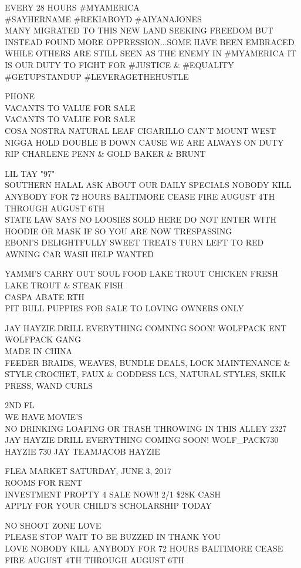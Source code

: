 \documentclass[10pt,letterpaper]{article}
\begin{document}
EVERY 28 HOURS \#MYAMERICA\\
\#SAYHERNAME \#REKIABOYD \#AIYANAJONES\\
MANY MIGRATED TO THIS NEW LAND SEEKING FREEDOM BUT INSTEAD FOUND MORE OPPRESSION...SOME HAVE BEEN EMBRACED WHILE OTHERS ARE STILL SEEN AS THE ENEMY IN \#MYAMERICA IT IS OUR DUTY TO FIGHT FOR \#JUSTICE \& \#EQUALITY \#GETUPSTANDUP \#LEVERAGETHEHUSTLE

PHONE\\
VACANTS TO VALUE FOR SALE\\
VACANTS TO VALUE FOR SALE\\
COSA NOSTRA NATURAL LEAF CIGARILLO CAN'T MOUNT WEST NIGGA HOLD DOUBLE B DOWN CAUSE WE ARE ALWAYS ON DUTY RIP CHARLENE PENN \& GOLD BAKER \& BRUNT

LIL TAY "97"\\
SOUTHERN HALAL ASK ABOUT OUR DAILY SPECIALS NOBODY KILL ANYBODY FOR 72 HOURS BALTIMORE CEASE FIRE AUGUST 4TH THROUGH AUGUST 6TH\\
STATE LAW SAYS NO LOOSIES SOLD HERE DO NOT ENTER WITH HOODIE OR MASK IF SO YOU ARE NOW TRESPASSING\\
EBONI'S DELIGHTFULLY SWEET TREATS TURN LEFT TO RED AWNING CAR WASH HELP WANTED

YAMMI'S CARRY OUT SOUL FOOD LAKE TROUT CHICKEN FRESH LAKE TROUT \& STEAK FISH\\
CASPA ABATE RTH\\
PIT BULL PUPPIES FOR SALE TO LOVING OWNERS ONLY

JAY HAYZIE DRILL EVERYTHING COMNING SOON!  WOLFPACK ENT WOLFPACK GANG\\
MADE IN CHINA\\
FEEDER BRAIDS, WEAVES, BUNDLE DEALS, LOCK MAINTENANCE \& STYLE CROCHET, FAUX \& GODDESS LCS, NATURAL STYLES, SKILK PRESS, WAND CURLS

2ND FL\\
WE HAVE MOVIE'S\\
NO DRINKING LOAFING OR TRASH THROWING IN THIS ALLEY 2327\\
JAY HAYZIE DRILL EVERYTHING COMING SOON! WOLF\_PACK730 HAYZIE 730 JAY TEAMJACOB HAYZIE

FLEA MARKET SATURDAY, JUNE 3, 2017\\
ROOMS FOR RENT\\
INVESTMENT PROPTY 4 SALE NOW!! 2/1 \$28K CASH\\
APPLY FOR YOUR CHILD'S SCHOLARSHIP TODAY

NO SHOOT ZONE LOVE\\
PLEASE STOP WAIT TO BE BUZZED IN THANK YOU\\
LOVE NOBODY KILL ANYBODY FOR 72 HOURS BALTIMORE CEASE FIRE AUGUST 4TH THROUGH AUGUST 6TH
\end{document}
